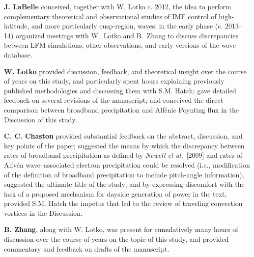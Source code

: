 \textbf{J. LaBelle} conceived, together with W. Lotko c. 2012, the
idea to perform complementary theoretical and observational studies of
IMF control of high-latitude, and more particularly cusp-region, \Alf
waves; in the early phase (c. 2013--14) organized meetings with
W.~Lotko and B.~Zhang to discuss discrepancies between LFM
simulations, other observations, and early versions of the \Alf wave
database.

\textbf{W. Lotko} provided discussion, feedback, and theoretical
insight over the course of years on this study, and particularly spent
hours explaining previously published methodologies and discussing
them with S.M. Hatch; gave detailed feedback on several revisions of
the manuscript; and conceived the direct comparison between broadband
precipitation and Alf\'{e}nic Poynting flux in the Discussion of this
study.

\textbf{C. C. Chaston} provided substantial feedback on the abstract,
discussion, and key points of the paper; suggested the means by which
the discrepancy between rates of broadband precipitation as defined by
\textsl{Newell et al.}~[2009] and rates of Alfv\'{e}n wave--associated
electron precipitation could be resolved (i.e., modification of the
definition of broadband precipitation to include pitch-angle
information); suggested the ultimate title of the study; and by
expressing discomfort with the lack of a proposed mechanism for
dayside generation of \Alfic power in the text, provided S.M. Hatch
the impetus that led to the review of traveling convection vortices in
the Discussion.

\textbf{B. Zhang}, along with W. Lotko, was present for cumulatively
many hours of discussion over the course of years on the topic of this
study, and provided commentary and feedback on drafts of the
manuscript.






